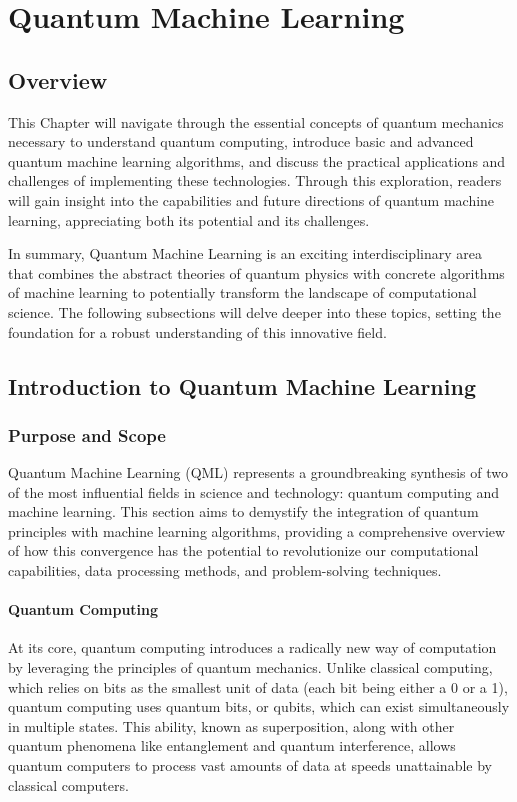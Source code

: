 \documentclass{book}
\begin{document}
\chapter{Quantum Machine Learning}

\section*{Overview}
This Chapter will navigate through the essential concepts of quantum mechanics necessary to understand quantum computing, introduce basic and advanced quantum machine learning algorithms, and discuss the practical applications and challenges of implementing these technologies. Through this exploration, readers will gain insight into the capabilities and future directions of quantum machine learning, appreciating both its potential and its challenges.

In summary, Quantum Machine Learning is an exciting interdisciplinary area that combines the abstract theories of quantum physics with concrete algorithms of machine learning to potentially transform the landscape of computational science. The following subsections will delve deeper into these topics, setting the foundation for a robust understanding of this innovative field.
\section{Introduction to Quantum Machine Learning}

\subsection{Purpose and Scope}

Quantum Machine Learning (QML) represents a groundbreaking synthesis of two of the most influential fields in science and technology: quantum computing and machine learning. This section aims to demystify the integration of quantum principles with machine learning algorithms, providing a comprehensive overview of how this convergence has the potential to revolutionize our computational capabilities, data processing methods, and problem-solving techniques.

\subsubsection{Quantum Computing}
At its core, quantum computing introduces a radically new way of computation by leveraging the principles of quantum mechanics. Unlike classical computing, which relies on bits as the smallest unit of data (each bit being either a 0 or a 1), quantum computing uses quantum bits, or qubits, which can exist simultaneously in multiple states. This ability, known as superposition, along with other quantum phenomena like entanglement and quantum interference, allows quantum computers to process vast amounts of data at speeds unattainable by classical computers.
\end{document}
